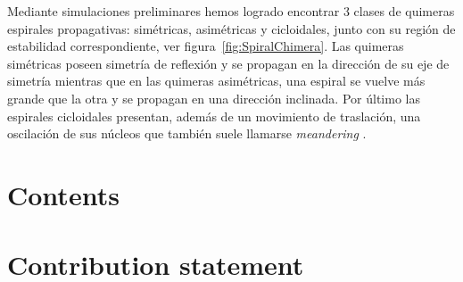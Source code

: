Mediante simulaciones preliminares hemos logrado encontrar 3 clases de quimeras espirales propagativas: simétricas, asimétricas y cicloidales, junto con su región de estabilidad correspondiente, ver figura~\ref{fig:SpiralChimera}. Las quimeras simétricas poseen simetría de reflexión y se propagan en la dirección de su eje de simetría mientras que en las quimeras asimétricas, una espiral se vuelve más grande que la otra y se propagan en una dirección inclinada. Por último las espirales cicloidales presentan, además de un movimiento de traslación, una oscilación de sus núcleos que también suele llamarse {\em meandering} \cite{SC:Bataille}.

\section{Contents}

\section{Contribution statement}